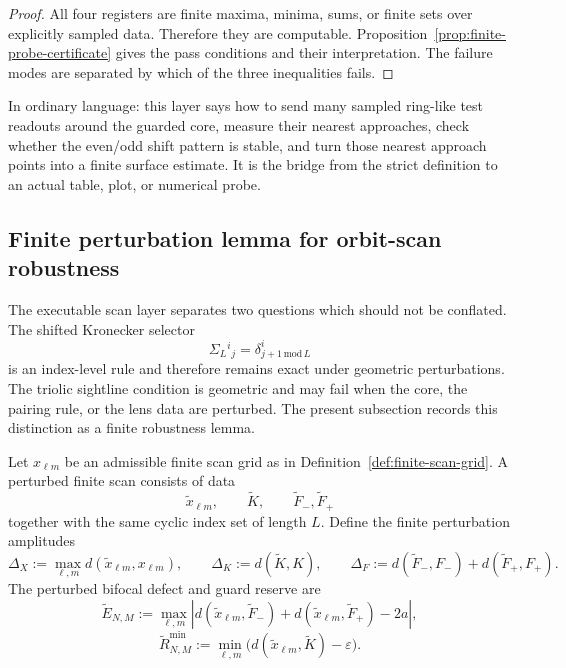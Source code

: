 \begin{proof}
All four registers are finite maxima, minima, sums, or finite sets over explicitly sampled data.  Therefore they are computable.  Proposition~\ref{prop:finite-probe-certificate} gives the pass conditions and their interpretation.  The failure modes are separated by which of the three inequalities fails.
\end{proof}

\begin{remark}
\label{rem:finite-probe-human-reading}
In ordinary language: this layer says how to send many sampled ring-like test readouts around the guarded core, measure their nearest approaches, check whether the even/odd shift pattern is stable, and turn those nearest approach points into a finite surface estimate.  It is the bridge from the strict definition to an actual table, plot, or numerical probe.
\end{remark}


\subsection{Finite perturbation lemma for orbit-scan robustness}
\label{subsec:finite-perturbation-lemma-orbit-scan-robustness}

The executable scan layer separates two questions which should not be conflated.  The shifted Kronecker selector
\[
\Sigma_L{}^i{}_j=\delta^i_{j+1\,\mathrm{mod}\,L}
\]
is an index-level rule and therefore remains exact under geometric perturbations.  The triolic sightline condition is geometric and may fail when the core, the pairing rule, or the lens data are perturbed.  The present subsection records this distinction as a finite robustness lemma.

\begin{definition}
\label{def:finite-perturbation-register}
Let $x_{\ell m}$ be an admissible finite scan grid as in Definition~\ref{def:finite-scan-grid}.  A perturbed finite scan consists of data
\[
\widetilde x_{\ell m},\qquad \widetilde K,\qquad \widetilde F_-,\widetilde F_+
\]
together with the same cyclic index set of length $L$.  Define the finite perturbation amplitudes
\[
\Delta_X:=\max_{\ell,m} d(\widetilde x_{\ell m},x_{\ell m}),
\qquad
\Delta_K:=d(\widetilde K,K),
\qquad
\Delta_F:=d(\widetilde F_-,F_-)+d(\widetilde F_+,F_+).
\]
The perturbed bifocal defect and guard reserve are
\[
\widetilde E_{N,M}:=\max_{\ell,m}
\left|d(\widetilde x_{\ell m},\widetilde F_-)+d(\widetilde x_{\ell m},\widetilde F_+)-2a\right|,
\]
\[
\widetilde R_{N,M}^{\min}:=\min_{\ell,m}\bigl(d(\widetilde x_{\ell m},\widetilde K)-\varepsilon\bigr).
\]
\end{definition}

